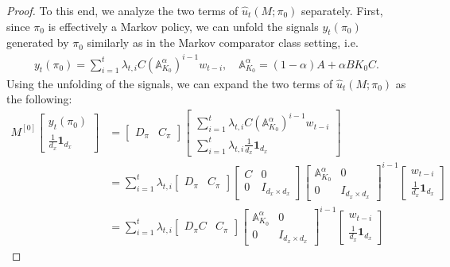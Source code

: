 \begin{proof}
To this end, we analyze the two terms of $\hat{u}_t(M;\pi_0)$ separately. First, since $\pi_0$ is effectively a Markov policy, we can unfold the signals $y_t(\pi_0)$ generated by $\pi_0$ similarly as in the Markov comparator class setting, i.e.
\begin{align*}
y_t(\pi_0)=\sum_{i=1}^t\lambda_{t,i}C(\mathbb{A}_{K_0}^{\alpha})^{i-1}w_{t-i}, \quad \mathbb{A}_{K_0}^{\alpha}=(1-\alpha)A+\alpha BK_0C.
\end{align*}
Using the unfolding of the signals, we can expand the two terms of $\hat{u}_t(M;\pi_0)$ as the following:
\begin{align*}
    M^{[0]}\begin{bmatrix}
    y_t(\pi_0) \\
    \frac{1}{d_x}\mathbf{1}_{d_x}
\end{bmatrix}&=\begin{bmatrix}
    D_{\pi} & C_{\pi}
\end{bmatrix} \begin{bmatrix}
    \sum_{i=1}^t \lambda_{t,i}C (\mathbb{A}_{K_0}^{\alpha})^{i-1} w_{t-i} \\ \sum_{i=1}^t \lambda_{t,i} \frac{1}{d_x}\mathbf{1}_{d_x}
\end{bmatrix}\\
&=\sum_{i=1}^t \lambda_{t,i} \begin{bmatrix}
    D_{\pi} & C_{\pi}
\end{bmatrix} \begin{bmatrix}
    C & 0 \\ 0 & I_{d_x\times d_x}
\end{bmatrix} \begin{bmatrix}
    \mathbb{A}_{K_0}^{\alpha} & 0 \\ 0 & I_{d_x\times d_x}
\end{bmatrix}^{i-1} \begin{bmatrix}
    w_{t-i} \\ \frac{1}{d_x}\mathbf{1}_{d_x}
\end{bmatrix}\\
&=\sum_{i=1}^t \lambda_{t,i} \begin{bmatrix}
    D_{\pi} C & C_{\pi}
\end{bmatrix} \begin{bmatrix}
    \mathbb{A}_{K_0}^{\alpha} & 0 \\ 0 & I_{d_x\times d_x}
\end{bmatrix}^{i-1} \begin{bmatrix}
    w_{t-i} \\ \frac{1}{d_x}\mathbf{1}_{d_x}

\end{bmatrix}
\end{align*}
\end{proof}
